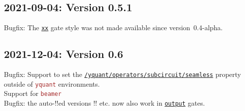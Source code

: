 \documentclass{scrartcl}
\def\pkg#1{\textcolor{brown}{\texttt{#1}}}
\def\gate#1{\hyperref[gate:#1]{\texttt{#1}}}
\def\style#1{\hyperref[style:#1]{\texttt{#1}}}
\def\Yquant{\pkg{yquant}}
\begin{document}
      \subsection*{2021-09-04: Version 0.5.1}
         Bugfix: The \gate{xx} gate style was not made available since version~0.4-alpha.

      \subsection*{2021-12-04: Version 0.6}
         Bugfix: Support to set the \style{/yquant/operators/subcircuit/seamless} property outside of \Yquant{} environments. \\
         Support for \pkg{beamer} \\
         Bugfix: the auto\hyp\tex!\protect!ed versions \tex!\Ifnum! etc. now also work in \gate{output} gates.
\end{document}
